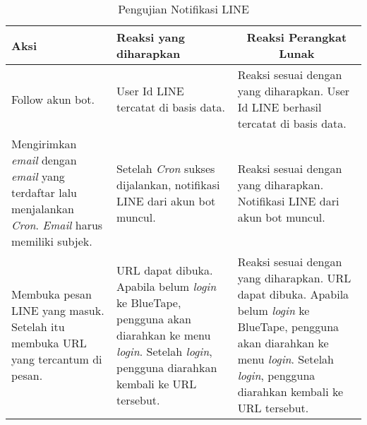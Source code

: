 \begin{itemize}
    \begin{center}
      \begin{table}[H]
        \caption{Pengujian Notifikasi LINE}
        \label{table:pengujian-fungsional-notifikasi-line}
        \begin{tabular}{|p{5cm}|p{5cm}|p{5cm}|}
        \hline
        \centering Aksi	& 	\centering Reaksi yang diharapkan &  \multicolumn{1}{c|}{Reaksi Perangkat Lunak} \\
        \hline
        Follow akun bot. & User Id LINE tercatat di basis data. & Reaksi sesuai dengan yang diharapkan. User Id LINE berhasil tercatat di basis data.\\
        \hline 
        Mengirimkan \textit{email} dengan \textit{email} yang terdaftar lalu menjalankan \textit{Cron}. \textit{Email} harus memiliki subjek. & Setelah \textit{Cron} sukses dijalankan, notifikasi LINE dari akun bot muncul. & Reaksi sesuai dengan yang diharapkan. Notifikasi LINE dari akun bot muncul. \\
        \hline
        Membuka pesan LINE yang masuk. Setelah itu membuka URL yang tercantum di pesan. & URL dapat dibuka. Apabila belum \textit{login} ke BlueTape, pengguna akan diarahkan ke menu \textit{login}. Setelah \textit{login}, pengguna diarahkan kembali ke URL tersebut. & Reaksi sesuai dengan yang diharapkan. URL dapat dibuka. Apabila belum \textit{login} ke BlueTape, pengguna akan diarahkan ke menu \textit{login}. Setelah \textit{login}, pengguna diarahkan kembali ke URL tersebut.  \\
        \hline
        \end{tabular}
    \end{table}
    \end{center}
\end{itemize}


